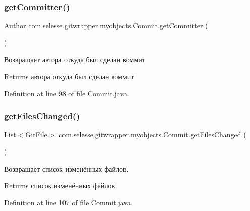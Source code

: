 \subsubsection{\texorpdfstring{get\+Committer()}{getCommitter()}}
{\footnotesize\ttfamily \hyperlink{classcom_1_1selesse_1_1gitwrapper_1_1myobjects_1_1_author}{Author} com.\+selesse.\+gitwrapper.\+myobjects.\+Commit.\+get\+Committer (\begin{DoxyParamCaption}{ }\end{DoxyParamCaption})}

Возвращает автора откуда был сделан коммит

\begin{DoxyReturn}{Returns}
автора откуда был сделан коммит 
\end{DoxyReturn}


Definition at line 98 of file Commit.\+java.

\mbox{\label{classcom_1_1selesse_1_1gitwrapper_1_1myobjects_1_1_commit_a8e5918c57c058849abcf750ae7f3c7b6}} 
\subsubsection{\texorpdfstring{get\+Files\+Changed()}{getFilesChanged()}}
{\footnotesize\ttfamily List$<$\hyperlink{classcom_1_1selesse_1_1gitwrapper_1_1myobjects_1_1_git_file}{Git\+File}$>$ com.\+selesse.\+gitwrapper.\+myobjects.\+Commit.\+get\+Files\+Changed (\begin{DoxyParamCaption}{ }\end{DoxyParamCaption})}

Возвращает список изменённых файлов.

\begin{DoxyReturn}{Returns}
список изменённых файлов 
\end{DoxyReturn}


Definition at line 107 of file Commit.\+java.

\mbox{\label{classcom_1_1selesse_1_1gitwrapper_1_1myobjects_1_1_commit_a21f2fe035bb2089e9eb6bd788302c9ae}} 
